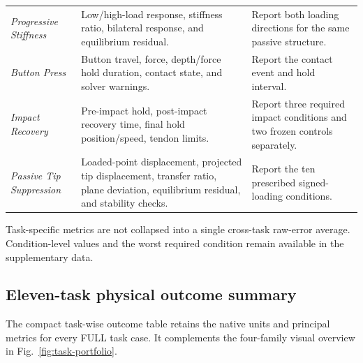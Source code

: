\begin{table}[t]
\begin{tabularx}{\textwidth}{@{}>{\itshape}p{}!{\color{TraceGray}\vrule width 0.25pt} Y Y@{}}
Progressive Stiffness & Low/high-load response, stiffness ratio, bilateral response, and equilibrium residual. & Report both loading directions for the same passive structure. \\
Button Press & Button travel, force, depth/force hold duration, contact state, and solver warnings. & Report the contact event and hold interval. \\
Impact Recovery & Pre-impact hold, post-impact recovery time, final hold position/speed, tendon limits. & Report three required impact conditions and two frozen controls separately. \\
Passive Tip Suppression & Loaded-point displacement, projected tip displacement, transfer ratio, plane deviation, equilibrium residual, and stability checks. & Report the ten prescribed signed-loading conditions. \\
\bottomrule
\end{tabularx}
\end{table}

Task-specific metrics are not collapsed into a single cross-task raw-error average. Condition-level values and the worst required condition remain available in the supplementary data.

\subsection{Eleven-task physical outcome summary}

The compact task-wise outcome table retains the native units and principal metrics for every FULL task case. It complements the four-family visual overview in Fig.~\ref{fig:task-portfolio}.

